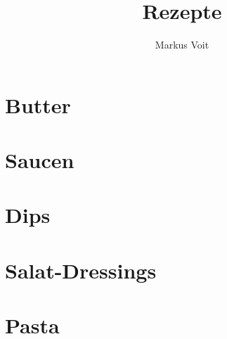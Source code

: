 \documentclass[
  DIV=11,%
  pagesize,%
  fontsize=11pt,%
  paper=a4,%
  numbers=noenddot,
]{scrartcl}
\title{Rezepte}
\author{Markus Voit}
\begin{document}
\maketitle
\clearpage
\tableofcontents
\clearpage

\section{Butter}
\newpage
\newpage
\newpage
\newpage

\section{Saucen}
\newpage
\newpage
\newpage
\newpage

\section{Dips}
\newpage

\section{Salat-Dressings}
\newpage

\section{Pasta}
\newpage
\end{document}
